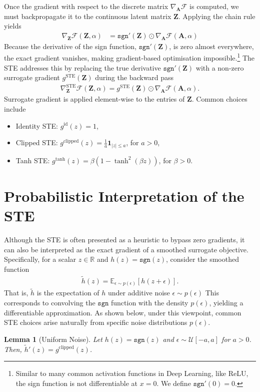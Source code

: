 \documentclass[lettersize,journal]{IEEEtran}
\newtheorem{lemma}{Lemma}
\providecommand{\BA}{{\mathbf A}}
\providecommand{\BZ}{{\mathbf Z}}
\begin{document}
Once the gradient with respect to the discrete matrix $\nabla_\BA \mathcal{F}$ is computed, we must backpropagate it to the continuous latent matrix $\BZ$. Applying the chain rule yields
\begin{align}
    \nabla_\BZ \mathcal{F}(\BZ, \alpha) &= \texttt{sgn}'(\BZ) \odot \nabla_\BA \mathcal{F}(\BA, \alpha)
    \label{eq:bilevel_grad}
\end{align}
Because the derivative of the sign function, $\texttt{sgn}'(\BZ)$, is zero almost everywhere, the exact gradient vanishes, making gradient-based optimisation impossible.\footnote{Similar to many common activation functions in Deep Learning, like ReLU, the sign function is not differentiable at $x=0$. We define $\texttt{sgn}'(0)=0$.} 
The STE addresses this by replacing the true derivative $\texttt{sgn}'(\BZ)$ with a non-zero surrogate gradient $g^\text{STE}(\BZ)$ during the backward pass
\begin{align}
    \nabla_\BZ^\text{STE} \mathcal{F}(\BZ, \alpha) = g^\text{STE}(\BZ) \odot \nabla_\BA \mathcal{F}(\BA, \alpha).
\end{align}
Surrogate gradient is applied element-wise to the entries of $\BZ$.
Common choices include
\begin{itemize}
    \item Identity STE: $g^\text{id}(z) = 1$,
    \item Clipped STE: $g^\text{clipped}(z) = \frac{1}{a} \mathbf{1}_{|z| \le a}$, for $a>0$,
    \item Tanh STE: $g^\text{tanh}(z) = \beta (1 - \tanh^2(\beta z))$, for $\beta>0$.
\end{itemize}

\section{Probabilistic Interpretation of the STE}
\label{sec:prob_inter_ste}
Although the STE is often presented as a heuristic to bypass zero gradients, it can also be interpreted as the exact gradient of a smoothed surrogate objective. 
Specifically, for a scalar $z \in \mathbb{R}$ and $h(z) = \texttt{sgn}(z)$, consider the smoothed function
\begin{align}
    \tilde{h}(z) = \mathbb{E}_{\epsilon \sim p(\epsilon)}[h(z + \epsilon)].
\end{align}
That is, $\tilde h$ is the expectation of $h$ under additive noise $\epsilon \sim p(\epsilon)$
This corresponds to convolving the $\texttt{sgn}$ function with the density $p(\epsilon)$, yielding a differentiable  approximation. 
As shown below, under this viewpoint, common STE choices arise naturally from specific noise distributions $p(\epsilon)$. 
\begin{lemma}[Uniform Noise]
    Let $h(z) = \texttt{sgn}(z)$ and $\epsilon \sim \mathcal{U}[-a, a]$ for $a > 0$. Then,  $\tilde{h}'(z)=g^\text{clipped}(z)$.
\end{lemma}
\end{document}
